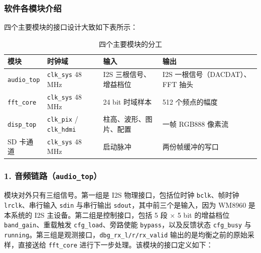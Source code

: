 \documentclass[withoutpreface,bwprint]{cumcmthesis}
\begin{document}
\subsubsection{软件各模块介绍}

四个主要模块的接口设计大致如下表所示：

\begin{table}[H]
\centering
\caption{四个主要模块的分工}
\label{tab:swmodule}
\begin{tabular}{p{1.8cm}p{3.0cm}p{3.4cm}p{5.0cm}}
\toprule[1.5pt]
\rowcolor{gray!25} 模块 & 时钟域 & 输入 & 输出 \\
\midrule[1pt]
\texttt{audio\_top} & \texttt{clk\_sys} 48\,MHz & I2S 三根信号、增益档位 & I2S 一根信号（DACDAT）、FFT 抽头 \\
\texttt{fft\_core}   & \texttt{clk\_sys} 48\,MHz & 24 bit 时域样本 & 512 个频点的幅度 \\
\texttt{disp\_top}   & \texttt{clk\_pix} / \texttt{clk\_hdmi} & 柱高、波形、图片、配置 & 一帧 RGB888 像素流 \\
SD 卡通道 & \texttt{clk\_sys} 48\,MHz & 启动脉冲 & 两份帧缓冲的写口 \\
\bottomrule[1.5pt]
\end{tabular}
\end{table}

\subsubsection*{1. 音频链路（\texttt{audio\_top}）}

模块对外只有三组信号。第一组是 I2S 物理接口，包括位时钟 \texttt{bclk}、帧时钟 \texttt{lrclk}、串行输入 \texttt{sdin} 与串行输出 \texttt{sdout}，其中前三个是输入，因为 WM8960 是本系统的 I2S 主设备。第二组是控制接口，包括 5 段 × 5 bit 的增益档位 \texttt{band\_gain}、重载触发 \texttt{cfg\_load}、旁路使能 \texttt{bypass}，以及反馈状态 \texttt{cfg\_busy} 与 \texttt{running}。第三组是观测接口，\texttt{dbg\_rx\_l/r/rx\_valid} 输出的是均衡之前的原始采样，直接送给 \texttt{fft\_core} 进行下一步处理。该模块的接口定义如下：
\end{document}
